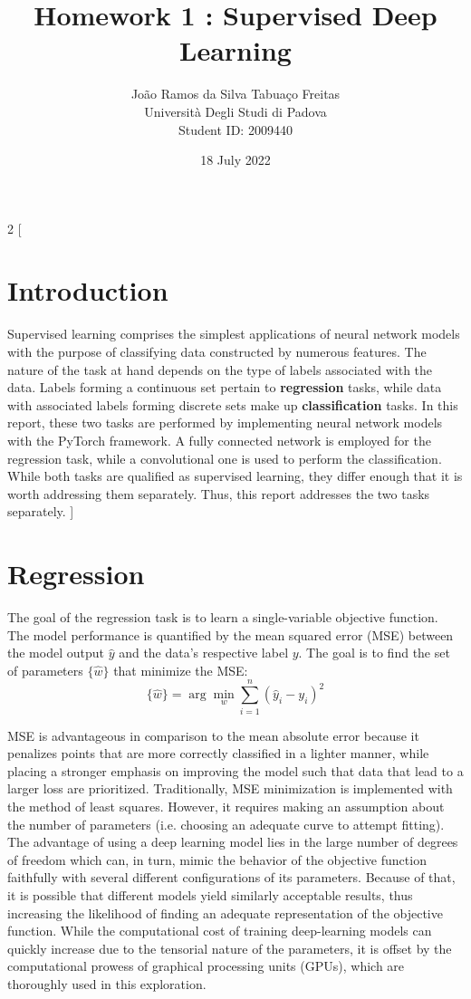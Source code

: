 \documentclass[11pt]{article} %
\title{Homework 1 : Supervised Deep Learning}
\author{João Ramos da Silva Tabuaço Freitas \\ Università Degli Studi di Padova \\ Student ID: 2009440}
\date{18 July 2022} %
\begin{document}
\maketitle
\begin{multicols}{2}
[
\section*{\centering Introduction}
Supervised learning comprises the simplest applications of neural network models with the purpose of classifying data constructed by numerous features. The nature of the task at hand depends on the type of labels associated with the data. Labels forming a continuous set pertain to \textbf{regression} tasks, while data with associated labels forming discrete sets make up \textbf{classification} tasks. In this report, these two tasks are performed by implementing neural network models with the PyTorch framework. A fully connected network is employed for the regression task, while a convolutional one is used to perform the classification. While both tasks are qualified as supervised learning, they differ enough that it is worth addressing them separately. Thus, this report addresses the two tasks separately.
]
\section{Regression}
The goal of the regression task is to learn a single-variable objective function. The model performance is quantified by the mean squared error (MSE) between the model output $\hat{y}$ and the data's respective label $y$. The goal is to find the set of parameters $\{\hat{w}\}$ that minimize the MSE:\\
\begin{equation}
\{\hat{w}\}= \arg\min_{w} \sum_{i = 1}^{n}\left(\hat{y}_i - y_i\right)^{2}
\end{equation}

\noindent MSE is advantageous in comparison to the mean absolute error because it penalizes points that are more correctly classified in a lighter manner, while placing a stronger emphasis on improving the model such that data that lead to a larger loss are prioritized. Traditionally, MSE minimization is implemented with the method of least squares. However, it requires making an assumption about the number of parameters (i.e. choosing an adequate curve to attempt fitting). The advantage of using a deep learning model lies in the large number of degrees of freedom which can, in turn, mimic the behavior of the objective function faithfully with several different configurations of its parameters. Because of that, it is possible that different models yield similarly acceptable results, thus increasing the likelihood of finding an adequate representation of the objective function. While the computational cost of training deep-learning models can quickly increase due to the tensorial nature of the parameters, it is offset by the computational prowess of graphical processing units (GPUs), which are thoroughly used in this exploration.

\end{multicols}
\end{document}
